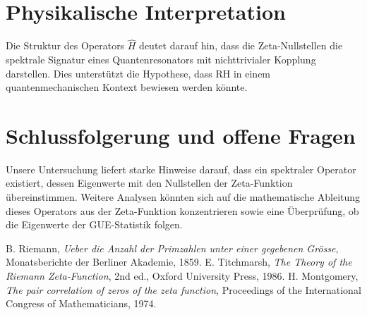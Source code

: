 \documentclass[a4paper,12pt]{article}
\begin{document}
\section{Physikalische Interpretation}
Die Struktur des Operators $\hat{H}$ deutet darauf hin, dass die Zeta-Nullstellen die spektrale Signatur eines Quantenresonators mit nichttrivialer Kopplung darstellen. Dies unterstützt die Hypothese, dass RH in einem quantenmechanischen Kontext bewiesen werden könnte.

\section{Schlussfolgerung und offene Fragen}
Unsere Untersuchung liefert starke Hinweise darauf, dass ein spektraler Operator existiert, dessen Eigenwerte mit den Nullstellen der Zeta-Funktion übereinstimmen. Weitere Analysen könnten sich auf die mathematische Ableitung dieses Operators aus der Zeta-Funktion konzentrieren sowie eine Überprüfung, ob die Eigenwerte der GUE-Statistik folgen.

\begin{thebibliography}{9}
 B. Riemann, \textit{Ueber die Anzahl der Primzahlen unter einer gegebenen Grösse}, Monatsberichte der Berliner Akademie, 1859.
 E. Titchmarsh, \textit{The Theory of the Riemann Zeta-Function}, 2nd ed., Oxford University Press, 1986.
 H. Montgomery, \textit{The pair correlation of zeros of the zeta function}, Proceedings of the International Congress of Mathematicians, 1974.
\end{thebibliography}
\end{document}
